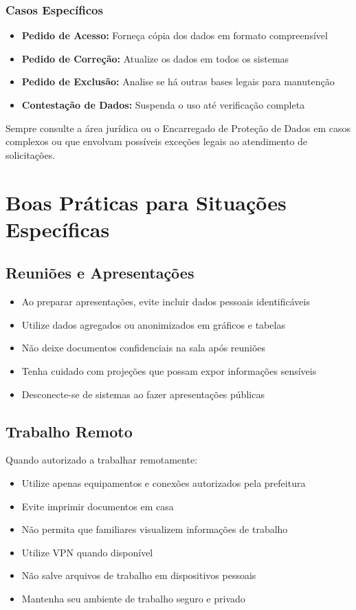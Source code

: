 \documentclass[12pt,a4paper]{article}
\begin{document}
\subsubsection{Casos Específicos}
\begin{itemize}
    \item \textbf{Pedido de Acesso:} Forneça cópia dos dados em formato compreensível
    \item \textbf{Pedido de Correção:} Atualize os dados em todos os sistemas
    \item \textbf{Pedido de Exclusão:} Analise se há outras bases legais para manutenção
    \item \textbf{Contestação de Dados:} Suspenda o uso até verificação completa
\end{itemize}

\begin{tcolorbox}[colback=azulclaro, colframe=blue!75!black, title=Importante]
Sempre consulte a área jurídica ou o Encarregado de Proteção de Dados em casos complexos ou que envolvam possíveis exceções legais ao atendimento de solicitações.
\end{tcolorbox}

\newpage
\section{Boas Práticas para Situações Específicas}

\subsection{Reuniões e Apresentações}
\begin{itemize}
    \item Ao preparar apresentações, evite incluir dados pessoais identificáveis
    \item Utilize dados agregados ou anonimizados em gráficos e tabelas
    \item Não deixe documentos confidenciais na sala após reuniões
    \item Tenha cuidado com projeções que possam expor informações sensíveis
    \item Desconecte-se de sistemas ao fazer apresentações públicas
\end{itemize}

\subsection{Trabalho Remoto}
Quando autorizado a trabalhar remotamente:
\begin{itemize}
    \item Utilize apenas equipamentos e conexões autorizados pela prefeitura
    \item Evite imprimir documentos em casa
    \item Não permita que familiares visualizem informações de trabalho
    \item Utilize VPN quando disponível
    \item Não salve arquivos de trabalho em dispositivos pessoais
    \item Mantenha seu ambiente de trabalho seguro e privado
\end{itemize}
\end{document}
